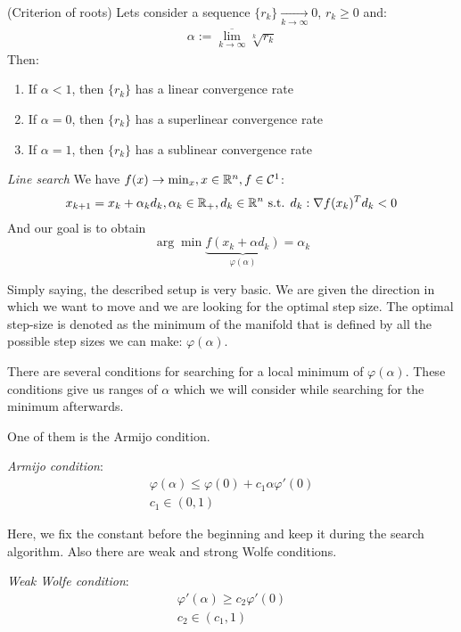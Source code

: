 \begin{theorem} (Criterion of roots) Lets consider a sequence $\{r_k\} \xrightarrow[k \to \infty]{} 0$, $r_k \geqslant 0$ and:
\begin{gather*}
  \alpha := \overline{\lim_{k \to \infty}} \sqrt[k]{r_k}
\end{gather*}
Then: 
\begin{enumerate}
  \item If $\alpha < 1$, then $\{r_k\}$ has a linear convergence rate
  \item If $\alpha = 0$, then $\{r_k\}$ has a superlinear convergence rate
  \item If $\alpha = 1$, then $\{r_k\}$ has a sublinear convergence rate
\end{enumerate}
\end{theorem}

\begin{definition} \textit{Line search} We have $f(x) \to \min_{x}, x \in \mathbb{R}^n, f \in \mathcal{C}^1$:
\begin{gather*}
  x_{k+1} = x_k + \alpha_k d_k, \alpha_k \in \mathbb{R}_+, d_k \in \mathbb{R}^n \text{ s.t. } d_k: \nabla f(x_k)^T d_k < 0
\end{gather*}
And our goal is to obtain 
$$
  \arg \min \underbrace{f(x_k + \alpha d_k)}_{\varphi(\alpha)} = \alpha_k
$$
\end{definition}

Simply saying, the described setup is very basic. We are given the direction in which we want to move and we are looking for the optimal step size. The optimal step-size is denoted as the minimum of the manifold that is defined by all the possible step sizes we can make: $\varphi(\alpha)$.

There are several conditions for searching for a local minimum of $\varphi(\alpha)$. These conditions give us ranges of $\alpha$ which we will consider while searching for the minimum afterwards.

One of them is the Armijo condition.
\begin{definition} \textit{Armijo condition}:
\begin{gather*}
  \varphi(\alpha) \leqslant \varphi(0) + c_1 \alpha \varphi'(0) \\
  c_1 \in (0, 1)
\end{gather*}
\end{definition}

Here, we fix the constant before the beginning and keep it during the search algorithm. Also there are weak and strong Wolfe conditions.
\begin{definition} \textit{Weak Wolfe condition}:
\begin{gather*}
  \varphi'(\alpha) \geqslant c_2 \varphi'(0) \\
  c_2 \in (c_1, 1)
\end{gather*}
\end{definition}

